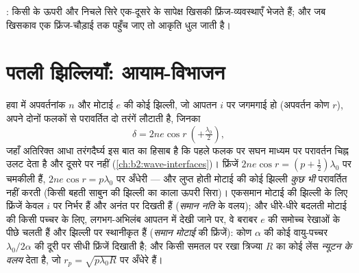 \begin{omfigure}

{\small {}: किसी  के ऊपरी और निचले सिरे
एक-दूसरे के सापेक्ष खिसकी फ्रिंज-व्यवस्थाएँ भेजते हैं; और जब खिसकाव
एक फ्रिंज-चौड़ाई तक पहुँच जाए तो आकृति धुल जाती है।}
\end{omfigure}

\section{पतली झिल्लियाँ: आयाम-विभाजन}

\begin{proposition}\label{prop:b2:two-wave-interference:film}
हवा में अपवर्तनांक $n$ और मोटाई $e$ की कोई झिल्ली, जो आपतन $i$ पर जगमगाई हो
(अपवर्तन कोण $r$), अपने दोनों फलकों से परावर्तित दो तरंगें लौटाती है,
जिनका 
\[
\delta = 2ne\cos r \ (+\tfrac{\lambda_0}2) ,
\]
जहाँ अतिरिक्त आधा तरंगदैर्घ्य इस बात का हिसाब है कि पहले फलक पर सघन माध्यम
पर परावर्तन चिह्न उलट देता है और दूसरे पर नहीं
(\cref{ch:b2:wave-interfaces})। फ्रिंजें $2ne\cos r =
(p + \tfrac12)\lambda_0$ पर चमकीली हैं, $2ne\cos r = p\lambda_0$ पर अँधेरी --- और
लुप्त होती मोटाई की कोई झिल्ली \emph{कुछ भी} परावर्तित नहीं करती (किसी बहती साबुन
की झिल्ली का काला ऊपरी सिरा)। एकसमान मोटाई की झिल्ली के लिए फ्रिंजें केवल $i$ पर
निर्भर हैं और अनंत पर दिखती हैं (\emph{समान नति} के वलय); और धीरे-धीरे
बदलती मोटाई की किसी पच्चर के लिए, लगभग-अभिलंब आपतन में देखी जाने पर, वे
बराबर $e$ की समोच्च रेखाओं के पीछे चलती हैं और झिल्ली पर स्थानीकृत हैं
(\emph{समान मोटाई} की फ्रिंजें): कोण $\alpha$ की कोई वायु-पच्चर
$\lambda_0/2\alpha$ की दूरी पर सीधी फ्रिंजें दिखाती है; और किसी समतल पर रखा त्रिज्या $R$ का कोई लेंस
\emph{न्यूटन के वलय} देता है, जो $r_p = \sqrt{p\lambda_0R}$ पर अँधेरे हैं।
\end{proposition}

